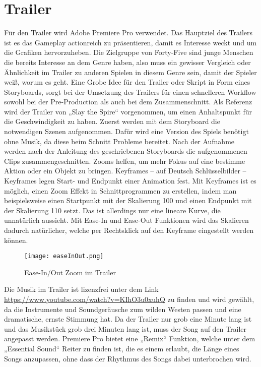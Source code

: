 
\section{Trailer}\label{sec:trailer}

\renewcommand{\kapitelautor}{Autor: Markus Böheim}

Für den Trailer wird Adobe Premiere Pro verwendet. Das Hauptziel des Trailers ist es das Gameplay actionreich zu präsentieren, damit es Interesse weckt und um die Grafiken hervorzuheben. Die Zielgruppe von Forty-Five sind junge Menschen die bereits Interesse an dem Genre haben, also muss ein gewisser Vergleich oder Ähnlichkeit im Trailer zu anderen Spielen in diesem Genre sein, damit der Spieler weiß, worum es geht. Eine Grobe Idee für den Trailer oder Skript in Form eines Storyboards, sorgt bei der Umsetzung des Trailers für einen schnelleren Workflow sowohl bei der Pre-Production als auch bei dem Zusammenschnitt. Als Referenz wird der Trailer von „Slay the Spire“ vorgenommen, um einen Anhaltspunkt für die Geschwindigkeit zu haben. Zuerst werden mit dem Storyboard die notwendigen Szenen aufgenommen. Dafür wird eine Version des Spiels benötigt ohne Musik, da diese beim Schnitt Probleme bereitet. Nach der Aufnahme werden nach der Anleitung des geschriebenen Storyboards die aufgenommenen Clips zusammengeschnitten. Zooms helfen, um mehr Fokus auf eine bestimme Aktion oder ein Objekt zu bringen. Keyframes – auf Deutsch Schlüsselbilder – Keyframes legen Start- und Endpunkt einer Animation fest. Mit Keyframes ist es möglich, einen Zoom Effekt in Schnittprogrammen zu erstellen, indem man beispielsweise einen Startpunkt mit der Skalierung 100 und einen Endpunkt mit der Skalierung 110 setzt. Das ist allerdings nur eine lineare Kurve, die unnatürlich aussieht. Mit Ease-In und Ease-Out Funktionen wird das Skalieren dadurch natürlicher, welche per Rechtsklick auf den Keyframe eingestellt werden können.

\begin{figure}[H]
    \centering
    \texttt{[image: easeInOut.png]}
    \caption{Ease-In/Out Zoom im Trailer}
\end{figure}

Die Musik im Trailer ist lizenzfrei unter dem Link \url{https://www.youtube.com/watch?v=KIhO3u0xuhQ} zu finden und wird gewählt, da die Instrumente und Soundgeräusche zum wilden Westen passen und eine dramatische, ernste Stimmung hat. Da der Trailer nur grob eine Minute lang ist und das Musikstück grob drei Minuten lang ist, muss der Song auf den Trailer angepasst werden. Premiere Pro bietet eine „Remix“ Funktion, welche unter dem „Essential Sound“ Reiter zu finden ist, die es einem erlaubt, die Länge eines Songs anzupassen, ohne dass der Rhythmus des Songs dabei unterbrochen wird.

